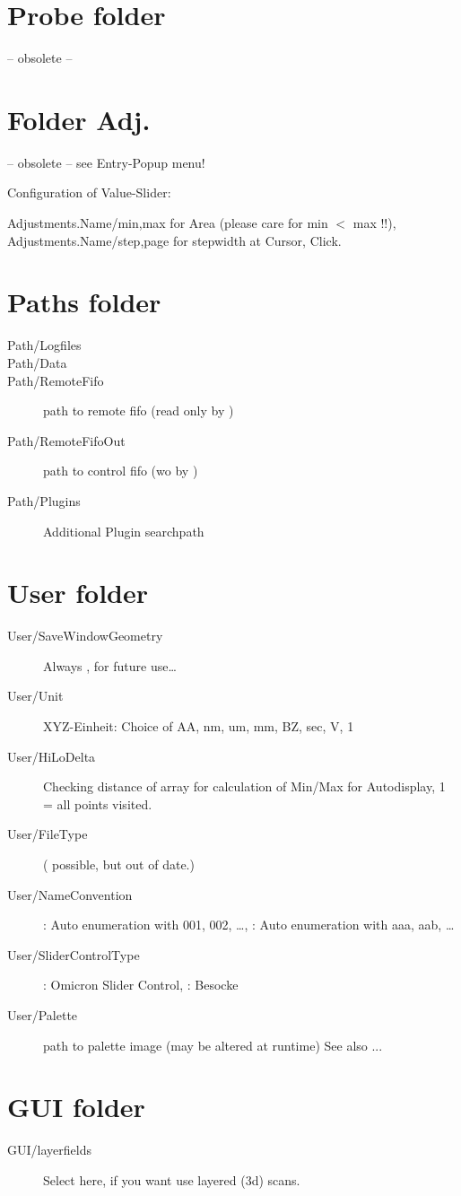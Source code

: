 \clearpage
\section{Probe folder}

-- obsolete --

\section{Folder Adj.}

-- obsolete -- see Entry-Popup menu!

Configuration of Value-Slider: 

Adjustments.Name/min,max for Area (please care for  min $<$ max !!),
Adjustments.Name/step,page for stepwidth at Cursor, Click.

\section{Paths folder}

\begin{description}
\item[Path/Logfiles] 
\item[Path/Data] 
\item[Path/RemoteFifo] path to remote fifo (read only by \Gxsm)
\item[Path/RemoteFifoOut] path to control fifo  (wo by \Gxsm)
\item[Path/Plugins] Additional Plugin searchpath
\end{description}


\section{User folder}

\begin{description}
\item[User/SaveWindowGeometry] Always , for future use\dots
\item[User/Unit] XYZ-Einheit: Choice of AA, nm, um, mm, BZ, sec, V, 1
\item[User/HiLoDelta] Checking distance of array for calculation of Min/Max for
        Autodisplay, 1 = all points visited.
\item[User/FileType]  ( possible, but out of date.)
\item[User/NameConvention] : Auto enumeration with 001, 002, \dots, 
  : Auto enumeration with aaa, aab, \dots
\item[User/SliderControlType] : Omicron Slider Control, : Besocke
\item[User/Palette] path to palette image (may be altered at runtime) See also ...
\end{description}

\section{GUI folder}

\begin{description}
\item[GUI/layerfields] Select here, if you want use layered (3d) scans.
\end{description}
